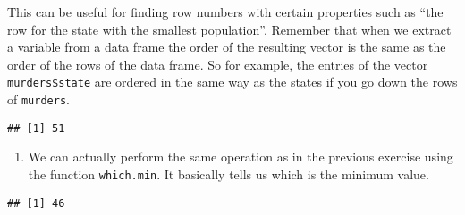 \documentclass[]{article}
\newenvironment{Shaded}{\begin{snugshade}}{\end{snugshade}}
\newcommand{\CommentTok}[1]{\textcolor[rgb]{0.56,0.35,0.01}{\textit{#1}}}
\newcommand{\DecValTok}[1]{\textcolor[rgb]{0.00,0.00,0.81}{#1}}
\newcommand{\KeywordTok}[1]{\textcolor[rgb]{0.13,0.29,0.53}{\textbf{#1}}}
\newcommand{\NormalTok}[1]{#1}
\newcommand{\OperatorTok}[1]{\textcolor[rgb]{0.81,0.36,0.00}{\textbf{#1}}}
\newcommand{\StringTok}[1]{\textcolor[rgb]{0.31,0.60,0.02}{#1}}
\providecommand{\tightlist}{%
  \setlength{\itemsep}{0pt}\setlength{\parskip}{0pt}}
\begin{document}
This can be useful for finding row numbers with certain properties such
as ``the row for the state with the smallest population''. Remember that
when we extract a variable from a data frame the order of the resulting
vector is the same as the order of the rows of the data frame. So for
example, the entries of the vector \texttt{murders\$state} are ordered
in the same way as the states if you go down the rows of
\texttt{murders}.

\begin{Shaded}
\end{Shaded}

\begin{verbatim}
## [1] 51
\end{verbatim}

\begin{enumerate}
\def\labelenumi{\arabic{enumi}.}
\setcounter{enumi}{2}
\tightlist
\item
  We can actually perform the same operation as in the previous exercise
  using the function \texttt{which.min}. It basically tells us which is
  the minimum value.
\end{enumerate}

\begin{Shaded}
\end{Shaded}

\begin{verbatim}
## [1] 46
\end{verbatim}

\begin{Shaded}
\end{Shaded}
\end{document}
